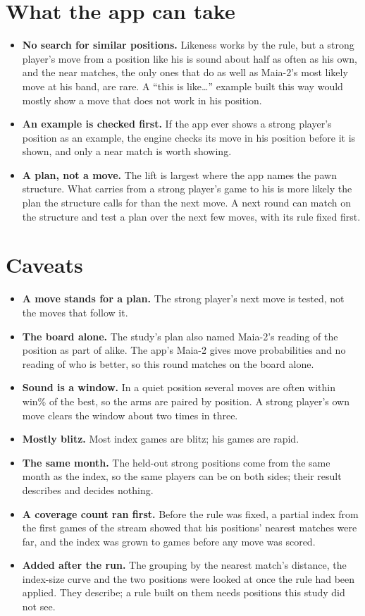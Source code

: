 \documentclass[11pt]{article}
\begin{document}
\section{What the app can take}

\begin{itemize}[nosep]
\item \textbf{No search for similar positions.} Likeness works by the rule, but a strong player's
  move from a position like his is sound about half as often as his own, and the near matches,
  the only ones that do as well as Maia-2's most likely move at his band, are rare. A ``this is
  like\ldots'' example built this way would mostly show a move that does not work in his
  position.
\item \textbf{An example is checked first.} If the app ever shows a strong player's position as an
  example, the engine checks its move in his position before it is shown, and only a near match
  is worth showing.
\item \textbf{A plan, not a move.} The lift is largest where the app names the pawn structure.
  What carries from a strong player's game to his is more likely the plan the structure calls
  for than the next move. A next round can match on the structure and test a plan over the next
  few moves, with its rule fixed first.
\end{itemize}

\section{Caveats}

\begin{itemize}[nosep]
\item \textbf{A move stands for a plan.} The strong player's next move is tested, not the moves
  that follow it.
\item \textbf{The board alone.} The study's plan also named Maia-2's reading of the position as
  part of alike. The app's Maia-2 gives move probabilities and no reading of who is better, so
  this round matches on the board alone.
\item \textbf{Sound is a window.} In a quiet position several moves are often within \Window{}
  win\% of the best, so the arms are paired by position. A strong player's own move clears the
  window about two times in three.
\item \textbf{Mostly blitz.} Most index games are blitz; his games are rapid.
\item \textbf{The same month.} The held-out strong positions come from the same month as the
  index, so the same players can be on both sides; their result describes and decides nothing.
\item \textbf{A coverage count ran first.} Before the rule was fixed, a partial index from the
  first games of the stream showed that his positions' nearest matches were far, and the index
  was grown to \Cap{} games before any move was scored.
\item \textbf{Added after the run.} The grouping by the nearest match's distance, the index-size
  curve and the two positions were looked at once the rule had been applied. They describe; a
  rule built on them needs positions this study did not see.
\end{itemize}
\end{document}
